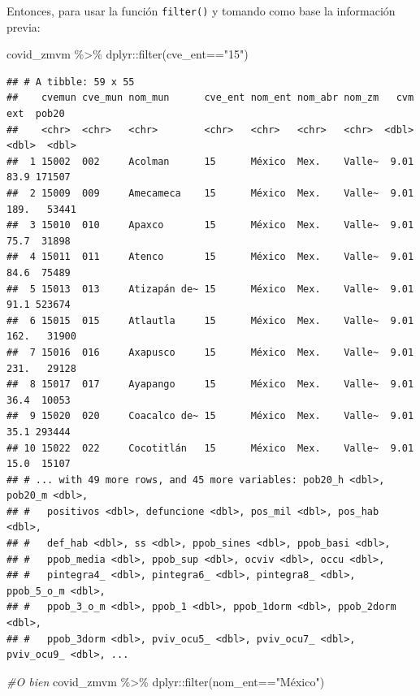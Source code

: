 \documentclass[
  11pt,
  oneside]{book}
\newenvironment{Shaded}{\begin{snugshade}}{\end{snugshade}}
\newcommand{\CommentTok}[1]{\textcolor[rgb]{0.56,0.35,0.01}{\textit{#1}}}
\newcommand{\FunctionTok}[1]{\textcolor[rgb]{0.00,0.00,0.00}{#1}}
\newcommand{\NormalTok}[1]{#1}
\newcommand{\SpecialCharTok}[1]{\textcolor[rgb]{0.00,0.00,0.00}{#1}}
\newcommand{\StringTok}[1]{\textcolor[rgb]{0.31,0.60,0.02}{#1}}
\begin{document}
Entonces, para usar la función \texttt{filter()} y tomando como base la información previa:

\begin{Shaded}
\begin{Highlighting}[]
\NormalTok{covid\_zmvm }\SpecialCharTok{\%\textgreater{}\%}\NormalTok{ dplyr}\SpecialCharTok{::}\FunctionTok{filter}\NormalTok{(cve\_ent}\SpecialCharTok{==}\StringTok{"15"}\NormalTok{)}
\end{Highlighting}
\end{Shaded}

\begin{verbatim}
## # A tibble: 59 x 55
##    cvemun cve_mun nom_mun      cve_ent nom_ent nom_abr nom_zm   cvm   ext  pob20
##    <chr>  <chr>   <chr>        <chr>   <chr>   <chr>   <chr>  <dbl> <dbl>  <dbl>
##  1 15002  002     Acolman      15      México  Mex.    Valle~  9.01  83.9 171507
##  2 15009  009     Amecameca    15      México  Mex.    Valle~  9.01 189.   53441
##  3 15010  010     Apaxco       15      México  Mex.    Valle~  9.01  75.7  31898
##  4 15011  011     Atenco       15      México  Mex.    Valle~  9.01  84.6  75489
##  5 15013  013     Atizapán de~ 15      México  Mex.    Valle~  9.01  91.1 523674
##  6 15015  015     Atlautla     15      México  Mex.    Valle~  9.01 162.   31900
##  7 15016  016     Axapusco     15      México  Mex.    Valle~  9.01 231.   29128
##  8 15017  017     Ayapango     15      México  Mex.    Valle~  9.01  36.4  10053
##  9 15020  020     Coacalco de~ 15      México  Mex.    Valle~  9.01  35.1 293444
## 10 15022  022     Cocotitlán   15      México  Mex.    Valle~  9.01  15.0  15107
## # ... with 49 more rows, and 45 more variables: pob20_h <dbl>, pob20_m <dbl>,
## #   positivos <dbl>, defuncione <dbl>, pos_mil <dbl>, pos_hab <dbl>,
## #   def_hab <dbl>, ss <dbl>, ppob_sines <dbl>, ppob_basi <dbl>,
## #   ppob_media <dbl>, ppob_sup <dbl>, ocviv <dbl>, occu <dbl>,
## #   pintegra4_ <dbl>, pintegra6_ <dbl>, pintegra8_ <dbl>, ppob_5_o_m <dbl>,
## #   ppob_3_o_m <dbl>, ppob_1 <dbl>, ppob_1dorm <dbl>, ppob_2dorm <dbl>,
## #   ppob_3dorm <dbl>, pviv_ocu5_ <dbl>, pviv_ocu7_ <dbl>, pviv_ocu9_ <dbl>, ...
\end{verbatim}

\begin{Shaded}
\begin{Highlighting}[]
\CommentTok{\#O bien}
\NormalTok{covid\_zmvm }\SpecialCharTok{\%\textgreater{}\%}\NormalTok{ dplyr}\SpecialCharTok{::}\FunctionTok{filter}\NormalTok{(nom\_ent}\SpecialCharTok{==}\StringTok{"México"}\NormalTok{)}
\end{Highlighting}
\end{Shaded}
\end{document}
